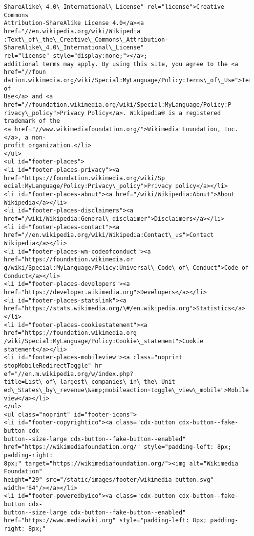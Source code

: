 \documentclass[11pt]{article}
\begin{document}
\begin{Verbatim}[commandchars=\\\{\}]
ShareAlike\_4.0\_International\_License" rel="license">Creative Commons
Attribution-ShareAlike License 4.0</a><a href="//en.wikipedia.org/wiki/Wikipedia
:Text\_of\_the\_Creative\_Commons\_Attribution-ShareAlike\_4.0\_International\_License"
rel="license" style="display:none;"></a>;
additional terms may apply. By using this site, you agree to the <a href="//foun
dation.wikimedia.org/wiki/Special:MyLanguage/Policy:Terms\_of\_Use">Terms of
Use</a> and <a href="//foundation.wikimedia.org/wiki/Special:MyLanguage/Policy:P
rivacy\_policy">Privacy Policy</a>. Wikipedia® is a registered trademark of the
<a href="//www.wikimediafoundation.org/">Wikimedia Foundation, Inc.</a>, a non-
profit organization.</li>
</ul>
<ul id="footer-places">
<li id="footer-places-privacy"><a href="https://foundation.wikimedia.org/wiki/Sp
ecial:MyLanguage/Policy:Privacy\_policy">Privacy policy</a></li>
<li id="footer-places-about"><a href="/wiki/Wikipedia:About">About
Wikipedia</a></li>
<li id="footer-places-disclaimers"><a
href="/wiki/Wikipedia:General\_disclaimer">Disclaimers</a></li>
<li id="footer-places-contact"><a
href="//en.wikipedia.org/wiki/Wikipedia:Contact\_us">Contact Wikipedia</a></li>
<li id="footer-places-wm-codeofconduct"><a href="https://foundation.wikimedia.or
g/wiki/Special:MyLanguage/Policy:Universal\_Code\_of\_Conduct">Code of
Conduct</a></li>
<li id="footer-places-developers"><a
href="https://developer.wikimedia.org">Developers</a></li>
<li id="footer-places-statslink"><a
href="https://stats.wikimedia.org/\#/en.wikipedia.org">Statistics</a></li>
<li id="footer-places-cookiestatement"><a href="https://foundation.wikimedia.org
/wiki/Special:MyLanguage/Policy:Cookie\_statement">Cookie statement</a></li>
<li id="footer-places-mobileview"><a class="noprint stopMobileRedirectToggle" hr
ef="//en.m.wikipedia.org/w/index.php?title=List\_of\_largest\_companies\_in\_the\_Unit
ed\_States\_by\_revenue\&amp;mobileaction=toggle\_view\_mobile">Mobile view</a></li>
</ul>
<ul class="noprint" id="footer-icons">
<li id="footer-copyrightico"><a class="cdx-button cdx-button--fake-button cdx-
button--size-large cdx-button--fake-button--enabled"
href="https://wikimediafoundation.org/" style="padding-left: 8px; padding-right:
8px;" target="https://wikimediafoundation.org/"><img alt="Wikimedia Foundation"
height="29" src="/static/images/footer/wikimedia-button.svg"
width="84"/></a></li>
<li id="footer-poweredbyico"><a class="cdx-button cdx-button--fake-button cdx-
button--size-large cdx-button--fake-button--enabled"
href="https://www.mediawiki.org" style="padding-left: 8px; padding-right: 8px;"

\end{Verbatim}
\end{document}
